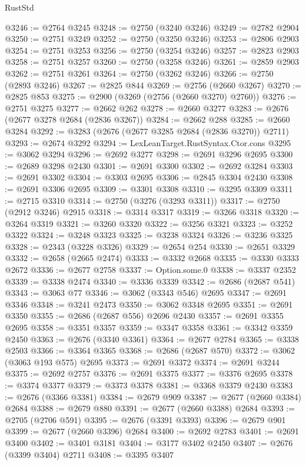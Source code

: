 \begin{lexlean}{RustStd}
\begin{coremodule}
@3246 := @2764 @3245
@3248 := @2750 (@3240 @3246)
@3249 := @2782 @2904
@3250 := @2751 @3249
@3252 := @2750 (@3250 @3246)
@3253 := @2806 @2903
@3254 := @2751 @3253
@3256 := @2750 (@3254 @3246)
@3257 := @2823 @2903
@3258 := @2751 @3257
@3260 := @2750 (@3258 @3246)
@3261 := @2859 @2903
@3262 := @2751 @3261
@3264 := @2750 (@3262 @3246)
@3266 := @2750 (@2893 @3246)
@3267 := @2825 @844
@3269 := @2756 (@2660 @3267)
@3270 := @2825 @853
@3275 := @2900 (@3269 (@2756 (@2660 @3270) @2760))
@3276 := @2751 @3275
@3277 := @2662 @262
@3278 := @2660 @3277
@3283 := @2676 (@2677 @3278 @2684 (@2836 @3267))
@3284 := @2662 @288
@3285 := @2660 @3284
@3292 := @3283 (@2676 (@2677 @3285 @2684 (@2836 @3270)) @2711)
@3293 := @2674 @3292
@3294 := LexLeanTarget.RustSyntax.Ctor.cons
@3295 := @3062 @3294
@3296 := @2692 @3277
@3298 := @2691 @3296 @2695
@3300 := @2689 @3298 @2430
@3301 := @2691 @3300
@3302 := @2692 @3284
@3303 := @2691 @3302
@3304 := @3303 @2695
@3306 := @2845 @3304 @2430
@3308 := @2691 @3306 @2695
@3309 := @3301 @3308
@3310 := @3295 @3309
@3311 := @2715 @3310
@3314 := @2750 (@3276 (@3293 @3311))
@3317 := @2750 (@2912 @3246) @2915
@3318 := @3314 @3317
@3319 := @3266 @3318
@3320 := @3264 @3319
@3321 := @3260 @3320
@3322 := @3256 @3321
@3323 := @3252 @3322
@3324 := @3248 @3323
@3325 := @3238 @3324
@3326 := @3236 @3325
@3328 := @2343 (@3228 @3326)
@3329 := @2654 @254
@3330 := @2651 @3329
@3332 := @2658 (@2665 @2474)
@3333 := @3332 @2668
@3335 := @3330 @3333 @2672
@3336 := @2677 @2758
@3337 := Option.some.{0}
@3338 := @3337 @2352
@3339 := @3338 @2474
@3340 := @3336 @3339
@3342 := @2686 (@2687 @541)
@3343 := @3063 @77
@3346 := @3062 (@3343 @546) @2695
@3347 := @2691 @3346
@3348 := @3241 @2473
@3350 := @3062 @3348 @2695
@3351 := @2691 @3350
@3355 := @2686 (@2687 @556) @2696 @2430
@3357 := @2691 @3355 @2695
@3358 := @3351 @3357
@3359 := @3347 @3358
@3361 := @3342 @3359 @2450
@3363 := @2676 (@3340 @3361)
@3364 := @2677 @2784
@3365 := @3338 @2503
@3366 := @3364 @3365
@3368 := @2686 (@2687 @570)
@3372 := @3062 (@3063 @193 @575) @2695
@3373 := @2691 @3372
@3374 := @2691 @3244
@3375 := @2692 @2757
@3376 := @2691 @3375
@3377 := @3376 @2695
@3378 := @3374 @3377
@3379 := @3373 @3378
@3381 := @3368 @3379 @2430
@3383 := @2676 (@3366 @3381)
@3384 := @2679 @909
@3387 := @2677 (@2660 @3384) @2684
@3388 := @2679 @880
@3391 := @2677 (@2660 @3388) @2684
@3393 := @2705 (@2706 @591)
@3395 := @2676 (@3391 @3393)
@3396 := @2679 @901
@3399 := @2677 (@2660 @3396) @2684
@3400 := @2692 @2783
@3401 := @2691 @3400
@3402 := @3401 @3181
@3404 := @3177 @3402 @2450
@3407 := @2676 (@3399 @3404) @2711
@3408 := @3395 @3407

\end{coremodule}
\end{lexlean}
